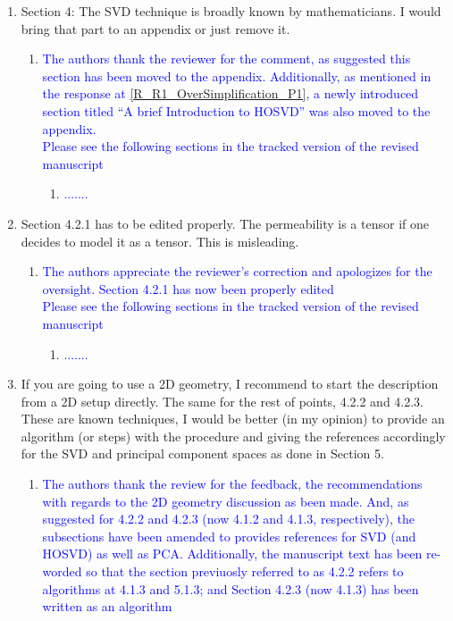 \documentclass[11pt]{letter} %
\newcommand{\blue}{\textcolor{blue}}
\begin{document}
\begin{letter}
{\begin{enumerate}
\begin{enumerate}
\begin{enumerate}
    \end{enumerate}
\item \label{R_R2_SVDWellKnown} Section 4: The SVD technique is broadly known by mathematicians. I would bring that part to an appendix or just remove it.
  \begin{enumerate}
  \item \label{R_R2_SVDWellKnown_1} \blue{The authors thank the reviewer for the comment, as suggested this section has been moved to the appendix. Additionally, as mentioned in the response at \ref{R_R1_OverSimplification_P1}, a newly introduced section titled ``A brief Introduction to HOSVD'' was also moved to the appendix.}\\
    \blue{Please see the following sections in the tracked version of the revised manuscript}
   \begin{enumerate}
 \item \blue{.......}
   \end{enumerate}
        \end{enumerate}
\item \label{R_R2_TensorCorrection}Section 4.2.1 has to be edited properly. The permeability is a tensor if one decides to model it as a tensor. This is misleading.
  \begin{enumerate}
  \item \label{R_R2_TensorCorrection_1} \blue{The authors appreciate the reviewer's correction and apologizes for the oversight. Section 4.2.1 has now been properly edited}\\
     \blue{Please see the following sections in the tracked version of the revised manuscript}
   \begin{enumerate}
 \item \blue{.......}
   \end{enumerate}
        \end{enumerate}
  \item \label{R_R2_GeomSetupAlgorithm} If you are going to use a 2D geometry, I recommend to start the description from a 2D setup directly. The same for the rest of points, 4.2.2 and 4.2.3. These are known techniques, I would be better (in my opinion) to provide an algorithm (or steps) with the procedure and giving the references accordingly for the SVD and principal component spaces as done in Section 5.
 \begin{enumerate}
 \item \label{R_R2_GeomSetupAlgorithm_1} \blue{The authors thank the review for the feedback, the recommendations with regards to the 2D geometry discussion as been made. And, as suggested for 4.2.2 and 4.2.3 (now 4.1.2 and 4.1.3, respectively), the subsections have been amended to provides references for SVD (and HOSVD) as well as PCA. Additionally, the manuscript text has been re-worded so that the section previuosly referred to as 4.2.2 refers to algorithms at 4.1.3 and 5.1.3; and Section 4.2.3 (now 4.1.3) has been written as an algorithm}\\

\end{enumerate}
\end{enumerate}
\end{enumerate}}
\end{letter}
\end{document}
